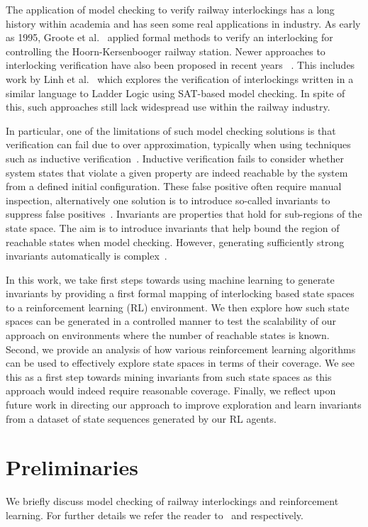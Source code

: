 \documentclass[runningheads]{llncs}
\begin{document}
The application of model checking to verify railway interlockings has a long history within
academia and has seen some real applications in industry. As early as 1995, Groote
et al.~\cite{groote1995safety} applied formal methods to verify an interlocking for controlling the Hoorn-Kersenbooger railway station. Newer approaches to interlocking verification have also been proposed in recent
years ~\cite{fantechi2012some, ferrari2011model, haxthausen2008modelling}. This includes work by Linh et al.~\cite{vu2014formal} which explores the verification
of interlockings written in a similar language to Ladder Logic using SAT-based model
checking. In spite of this, such approaches still lack widespread use within the railway industry. 

In particular, one of the limitations of such model checking solutions is that verification can fail due to over approximation, typically when using techniques such as inductive verification~\cite{4639322}. Inductive verification fails to consider whether system states that violate a given property are indeed reachable by the system from a defined initial configuration. These false positive  often require manual inspection, alternatively one solution is to introduce so-called invariants to suppress false positives~\cite{1688959}. Invariants are properties that hold for sub-regions of the state space. The aim is to introduce invariants that help bound the region of reachable states when model checking. However, generating sufficiently strong invariants automatically is complex~\cite{4723646}. 

In this work, we take first steps towards using machine learning to generate invariants by providing a first formal mapping of interlocking based state spaces to a reinforcement learning (RL) environment. We then explore how such state spaces can be generated in a controlled manner to test the scalability of our approach on environments where the number of reachable states is known. Second, we provide an analysis of how various reinforcement learning algorithms can be used to effectively explore state spaces in terms of their coverage. We see this as a first step towards mining invariants from such state spaces as this approach would indeed require reasonable coverage. Finally, we reflect upon future work in directing our approach to improve exploration and learn invariants from a dataset of state sequences generated by our RL agents. 


\section{Preliminaries}\label{sec:preliminaries}
We briefly discuss  model checking of railway interlockings and reinforcement learning. For further details we refer the reader to~\cite{kanso2009automated, james2013verification} and \cite{mnih2013playing,schulman2017proximal,mnih2016asynchronous} respectively.
\end{document}
